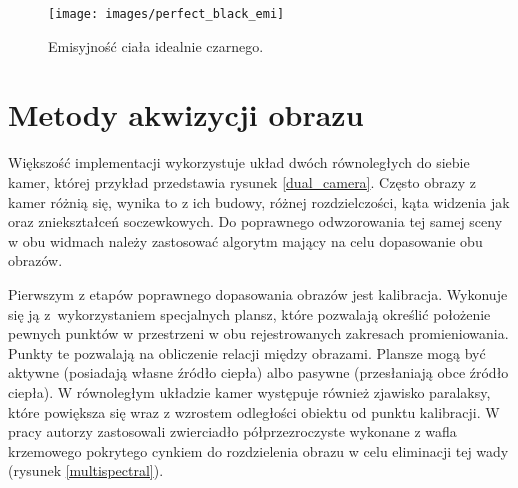 \begin{figure}
\centering
\texttt{[image: images/perfect\_black\_emi]}
\caption[Emisyjność ciała idealnie czarnego]{Emisyjność ciała idealnie czarnego.}
\label{fig:atmosfera_int}
\end{figure}


\section{Metody akwizycji obrazu}

Większość implementacji wykorzystuje układ dwóch równoległych do siebie kamer, której przykład przedstawia rysunek \ref{dual_camera}.  %
Często obrazy z kamer różnią się, wynika to z ich budowy, różnej rozdzielczości, kąta widzenia jak oraz zniekształceń soczewkowych.
Do poprawnego odwzorowania tej samej sceny w obu widmach należy zastosować algorytm mający na celu dopasowanie obu obrazów.

Pierwszym z etapów poprawnego dopasowania obrazów jest kalibracja.
Wykonuje się ją z~wykorzystaniem specjalnych plansz, które pozwalają określić położenie pewnych punktów w przestrzeni w obu rejestrowanych zakresach promieniowania. 
Punkty te pozwalają na obliczenie relacji między obrazami. 
Plansze mogą być aktywne (posiadają własne źródło ciepła) albo pasywne (przesłaniają obce źródło ciepła). 
W równoległym układzie kamer występuje również zjawisko paralaksy, które powiększa się wraz z wzrostem odległości obiektu od punktu kalibracji. 
W pracy \cite{hwang2015multispectral} autorzy zastosowali zwierciadło półprzezroczyste wykonane z wafla krzemowego pokrytego cynkiem do rozdzielenia obrazu w celu eliminacji tej wady (rysunek \ref{multispectral}).

